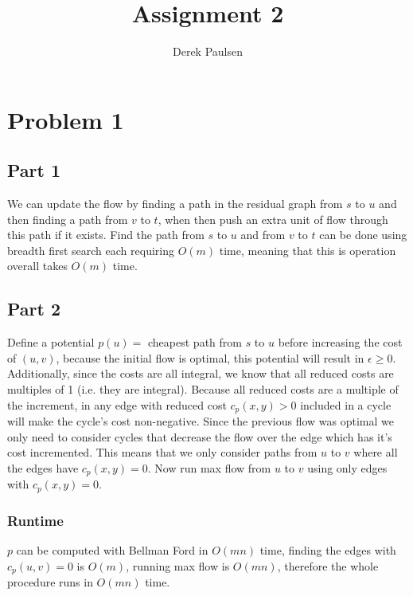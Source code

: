 \documentclass[a4paper]{article}
\title{Assignment 2} %
\author{
Derek Paulsen \\
}
\date{}
\begin{document}
\maketitle 

\section{Problem 1}
\subsection{Part 1}

We can update the flow by finding a path in the residual graph
from $s$ to $u$ and then finding a path from $v$ to 
$t$, when then push an extra unit of flow through this path if it 
exists. Find the path from $s$ to $u$ and from $v$ to 
$t$ can be done using breadth first search each requiring $O(m)$ time, meaning that
this is operation overall takes $O(m)$ time.


\subsection{Part 2}

Define a potential $p(u) = $ cheapest path from $s$ to $u$ before increasing the 
cost of $(u,v)$, because the initial flow is optimal, this potential will 
result in $\epsilon \geq 0$.
Additionally, since the costs are all integral, we know that all 
reduced costs are multiples of 1 (i.e. they are integral). Because all 
reduced costs are a multiple of the increment, in any edge with reduced cost 
$c_p(x,y) > 0$ included in a cycle will make the cycle's cost non-negative. 
Since the previous flow was optimal we only need to consider cycles that 
decrease the flow over the edge which has it's cost incremented. This means that
we only consider paths from $u$ to $v$ where all the edges have $c_p(x,y) = 0$.
Now run max flow from $u$ to $v$ using only edges 
with $c_p(x,y) = 0$.\\
\subsubsection*{Runtime}

$p$ can be computed with Bellman Ford in $O(mn)$ time, finding the edges with $c_p(u,v) = 0$ is $O(m)$, 
running max flow is $O(mn)$, therefore the whole procedure runs in $O(mn)$ time.
\end{document}
